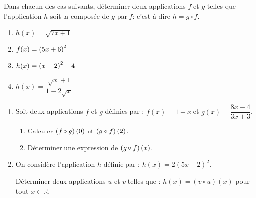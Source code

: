 \begin{exercice}[Décomposition]
 Dans chacun des cas suivants, déterminer deux applications   $  f $  et $ g $  telles que  l'application $ h $  soit la composée de   $  g $  par  $ f $:\; c'est à dire $ h=g\circ f $.

\begin{enumerate}
\item  $ h(x)= \sqrt{7x+1} $ 


\item  $ f(x)= \left(5x+6\right)^{2} $  


\item  $ h(x)= \left(x-2\right)^{2} -4 $ 



\item $ h(x)= \dfrac{\sqrt{x}+1}{1-2\sqrt{x}} $ 
\end{enumerate}

\end{exercice}
\begin{exercice}
\begin{enumerate}
\item Soit deux applications  $ f $ et $ g $ définies par :\;  $f(x)=1-x $ et $ g(x)=\dfrac{8x-4}{3x+3}$.
\begin{enumerate}
\item Calculer  $ \left(f\circ g\right)(0) $\;  et \; $ \left(g\circ f\right)(2) $.
\item Déterminer une expression de $ \left(g\circ f\right)(x) $. 
\end{enumerate}
\item On considère l'application $ h $ définie par :\; $ h(x)=2(5x-2)^2$.

 Déterminer deux applications  $ u $ et $ v $ telles que :\; $ h(x)=(v\circ u)(x)$\;\; pour tout \; $ x\in\mathbb{R} $.

\end{enumerate}
\end{exercice}
